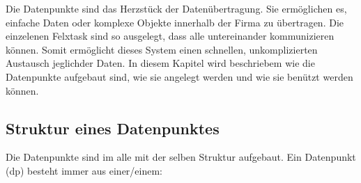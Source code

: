 Die Datenpunkte sind das Herzstück der Datenübertragung. Sie ermöglichen es, einfache Daten oder komplexe Objekte innerhalb der Firma zu übertragen. Die einzelenen Felxtask sind so ausgelegt, dass alle untereinander kommunizieren können. Somit ermöglicht dieses System einen schnellen, unkomplizierten Austausch jeglichder Daten. In diesem Kapitel wird beschriebem wie die Datenpunkte aufgebaut sind, wie sie angelegt werden und wie sie benützt werden können.

\subsection{Struktur eines Datenpunktes}\label{Datenpunkte} 

Die Datenpunkte sind im alle mit der selben Struktur aufgebaut. Ein Datenpunkt (dp) besteht immer aus einer/einem:

